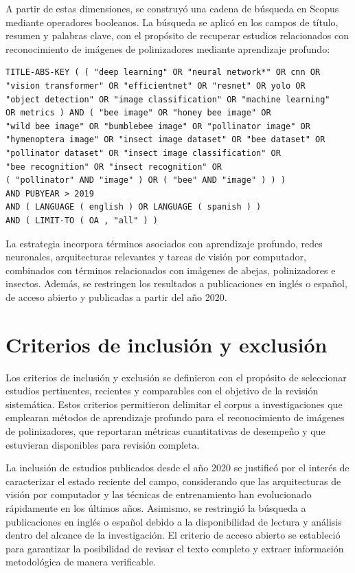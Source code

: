 \endgroup
\vspace{-1.0 cm}
A partir de estas dimensiones, se construyó una cadena de búsqueda en Scopus mediante operadores booleanos. La búsqueda se aplicó en los campos de título, resumen y palabras clave, con el propósito de recuperar estudios relacionados con reconocimiento de imágenes de polinizadores mediante aprendizaje profundo:

\begin{verbatim}
TITLE-ABS-KEY ( ( "deep learning" OR "neural network*" OR cnn OR 
"vision transformer" OR "efficientnet" OR "resnet" OR yolo OR 
"object detection" OR "image classification" OR "machine learning" 
OR metrics ) AND ( "bee image" OR "honey bee image" OR 
"wild bee image" OR "bumblebee image" OR "pollinator image" OR 
"hymenoptera image" OR "insect image dataset" OR "bee dataset" OR 
"pollinator dataset" OR "insect image classification" OR 
"bee recognition" OR "insect recognition" OR 
( "pollinator" AND "image" ) OR ( "bee" AND "image" ) ) ) 
AND PUBYEAR > 2019 
AND ( LANGUAGE ( english ) OR LANGUAGE ( spanish ) ) 
AND ( LIMIT-TO ( OA , "all" ) )
\end{verbatim}

La estrategia incorpora términos asociados con aprendizaje profundo, redes neuronales, arquitecturas relevantes y tareas de visión por computador, combinados con términos relacionados con imágenes de abejas, polinizadores e insectos. Además, se restringen los resultados a publicaciones en inglés o español, de acceso abierto y publicadas a partir del año 2020.

\section{Criterios de inclusión y exclusión}

Los criterios de inclusión y exclusión se definieron con el propósito de seleccionar estudios pertinentes, recientes y comparables con el objetivo de la revisión sistemática. Estos criterios permitieron delimitar el corpus a investigaciones que emplearan métodos de aprendizaje profundo para el reconocimiento de imágenes de polinizadores, que reportaran métricas cuantitativas de desempeño y que estuvieran disponibles para revisión completa.

La inclusión de estudios publicados desde el año 2020 se justificó por el interés de caracterizar el estado reciente del campo, considerando que las arquitecturas de visión por computador y las técnicas de entrenamiento han evolucionado rápidamente en los últimos años. Asimismo, se restringió la búsqueda a publicaciones en inglés o español debido a la disponibilidad de lectura y análisis dentro del alcance de la investigación. El criterio de acceso abierto se estableció para garantizar la posibilidad de revisar el texto completo y extraer información metodológica de manera verificable.

